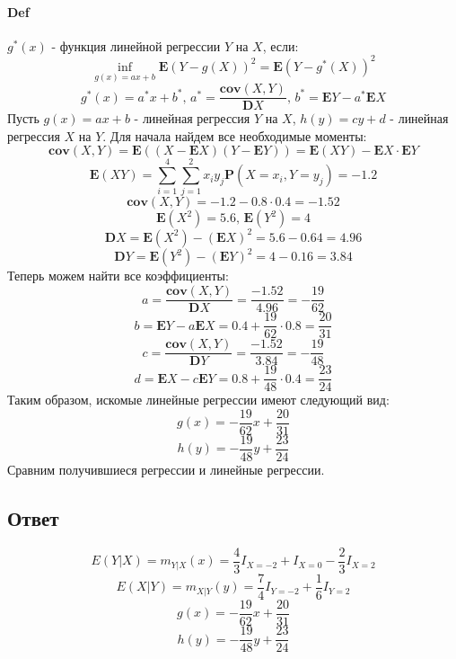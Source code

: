 \documentclass[fleqn, 10pt]{article}
\begin{document}
\paragraph{Def} \(g^{*}(x)\) - функция линейной регрессии \(Y\) на \(X\), если:
\[\inf\limits_{g(x)=ax+b}{\textbf{E}(Y-g(X))^2} = \textbf{E}(Y-g^{*}(X))^2\]
\[g^{*}(x) = a^{*}x+b^{*}\text{, }
a^{*} = \frac{\textbf{cov}(X,Y)}{\textbf{D}X}\text{, } b^{*} = \textbf{E}Y - a^{*}\textbf{E}X\]
Пусть \(g(x) = ax + b\) - линейная регрессия \(Y\) на \(X\), \(h(y) = cy + d\) - линейная регрессия \(X\) на \(Y\). Для начала найдем все необходимые моменты:
\[\textbf{cov}(X,Y) = \textbf{E}((X-\textbf{E}X)(Y-\textbf{E}Y)) = \textbf{E}(XY) - \textbf{E}X\cdot\textbf{E}Y\]
\[\textbf{E}(XY) = \sum\limits_{i=1}^{4}{\sum\limits_{j=1}^{2}{x_iy_j\textbf{P}(X=x_i,Y=y_j)}} = -1.2\]
\[\textbf{cov}(X,Y) = -1.2 - 0.8\cdot0.4 = -1.52\]
\[\textbf{E}(X^2) = 5.6\text{, }\textbf{E}(Y^2) = 4\]
\[\textbf{D}X = \textbf{E}(X^2) - (\textbf{E}X)^2 = 5.6 - 0.64 = 4.96\]
\[\textbf{D}Y = \textbf{E}(Y^2) - (\textbf{E}Y)^2 = 4 - 0.16 = 3.84\]
Теперь можем найти все коэффициенты:
\[a = \frac{\textbf{cov}(X, Y)}{\textbf{D}X} = \frac{-1.52}{4.96} = -\frac{19}{62}\]
\[b = \textbf{E}Y - a\textbf{E}X = 0.4 + \frac{19}{62}\cdot0.8 = \frac{20}{31}\]
\[c = \frac{\textbf{cov}(X, Y)}{\textbf{D}Y} = \frac{-1.52}{3.84} = -\frac{19}{48}\]
\[d = \textbf{E}X - c\textbf{E}Y = 0.8  + \frac{19}{48}\cdot0.4 = \frac{23}{24}\]
Таким образом, искомые линейные регрессии имеют следующий вид:
\[g(x) = -\frac{19}{62}x+\frac{20}{31}\]
\[h(y) = -\frac{19}{48}y + \frac{23}{24}\]
Сравним получившиеся регрессии и линейные регрессии.

\begin{center}
\end{center}

\begin{center}
\end{center}
\subsection{Ответ}
\[E(Y|X) = m_{Y|X}(x) =  \frac{4}{3}I_{X=-2}+I_{X=0}-\frac{2}{3}I_{X=2}\]
\[E(X|Y) = m_{X|Y}(y) =  \frac{7}{4}I_{Y=-2}+\frac{1}{6}I_{Y=2}\]
\[g(x) = -\frac{19}{62}x+\frac{20}{31}\]
\[h(y) = -\frac{19}{48}y + \frac{23}{24}\]
\end{document}
